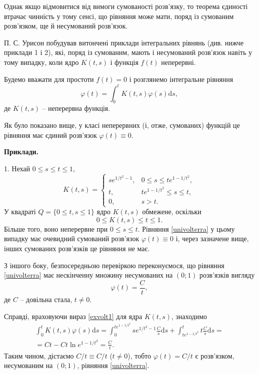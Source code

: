 \documentclass[14pt,twoside]{extreport}
\theoremstyle{mystyle}
\numberwithin{equation}{chapter}
\begin{document}
Однак якщо відмовитися від вимоги сумованості розв'язку, то теорема єдиності втрачає чинність у тому сенсі, що рівняння може мати, поряд із сумованим розв'язком, ще й несумований розв'язок.

П. С. Урисон  побудував витончені приклади інтегральних рівнянь (див. нижче приклади 1 і 2), які, поряд із сумованим, мають і несумований розв'язок навіть у тому випадку, коли ядро $K(t, s)$ і функція $f(t)$ неперервні.

Будемо вважати для простоти $f(t) = 0$ і розглянемо інтегральне рівняння
\begin{equation}\label{univolterra}
\varphi(t) = \int_{0}^{t} K(t, s) \varphi(s) \mathrm{d}s,
\end{equation}
де $K(t, s)$ -- неперервна функція.

Як було показано вище, у класі неперервних (і, отже, сумованих) функцій це рівняння має єдиний розв'язок $\varphi(t) \equiv 0$.

\textbf{Приклади.}

1. Нехай $0 \leqslant s \leqslant t \leqslant 1$,
\begin{equation}\label{exvolt1}
K(t, s) = \left\{
\begin{array}{ll}
se^{1/t^2-1}, & 0\leqslant s \leqslant te^{1-1/t^2},\\
t, & te^{1-1/t^2} \leqslant s \leqslant t,\\
0, & s>t.
\end{array}
\right.
\end{equation}
У квадраті $Q = \{0 \leqslant t, s \leqslant 1\}$ ядро $K(t, s)$ обмежене, оскільки
\[
0 \leqslant K(t, s) \leqslant t \leqslant 1.
\]
Більше того, воно неперервне при $0 \leqslant s \leqslant t$. Рівняння \eqref{univolterra} у цьому випадку має очевидний сумований розв'язок $\varphi(t) \equiv 0$ і, через зазначене вище, інших сумованих розв'язків це рівняння не має.

З іншого боку, безпосередньою перевіркою переконуємося, що рівняння \eqref{univolterra} має нескінченну множину несумованих на $(0; 1)$ розв'язків вигляду
\[
\varphi(t) = \frac{C}{t},
\]
де $C$ -- довільна стала, $t \neq 0$.

Справді, враховуючи вираз \eqref{exvolt1} для ядра $K(t, s)$, знаходимо
\begin{multline}
\int_{0}^{t} K(t, s) \varphi(s) \mathrm{d}s = \int_{0}^{te^{1-1/t^2}} se^{1/t^2-1} \frac{C}{s} \mathrm{d}s + \int_{te^{1-1/t^2}}^{t} t\frac{C}{s} \mathrm{d}s =\\
= Ct - Ct \ln e^{1-1/t^2} = \frac{C}{t}.
\end{multline}
Таким чином, дістаємо $C/t \equiv C/t$ ($t \neq 0$), тобто $\varphi(t) = C/t$ є розв'язком, несумованим на $(0; 1)$, рівняння \eqref{univolterra}.
\end{document}
